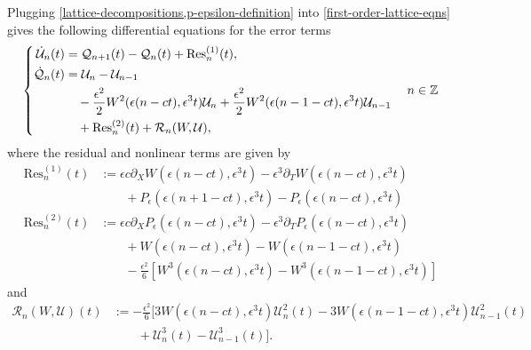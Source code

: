 Plugging \cref{lattice-decompositions,p-epsilon-definition} into \cref{first-order-lattice-eqns} gives the following differential equations for the error terms
\begin{equation}\label{error-lattice-eqns}
\left\{\begin{aligned}
		\dot{\mathcal U}_n(t) &= \mathcal Q_{n+1}(t) - \mathcal Q_n(t) + \mathrm{Res}_n^{(1)}(t),  \\
		\dot{\mathcal Q}_n(t) &= \mathcal U_{n} - \mathcal U_{n-1} \\ &\quad - \frac{\epsilon^2} 2 W^2(\epsilon(n-ct),\epsilon^3t) \mathcal{U}_n + \frac{\epsilon^2} 2 W^2(\epsilon(n-1-ct),\epsilon^3t)\mathcal{U}_{n-1} \\ &\quad +\mathrm{Res}_n^{(2)}(t)+ \mathcal R_n(W, \mathcal U),
\end{aligned} \right.\quad  n\in\mathbb{Z}
\end{equation}
where the residual and nonlinear terms are given by 
\begin{equation}
	\begin{aligned}
		\mathrm{Res}^{(1)}_n(t)&:= \epsilon c \partial_X W(\epsilon(n-ct),\epsilon^3t) - \epsilon^3 \partial_T W(\epsilon(n-ct), \epsilon^3 t) \\ 
		&\qquad+ P_\epsilon(\epsilon(n+1 - ct), \epsilon^3t) - P_\epsilon(\epsilon(n-ct), \epsilon^3t) \\
		\mathrm{Res}^{(2)}_n(t)&:= \epsilon c \partial_X P_\epsilon(\epsilon(n-ct),\epsilon^3t) - \epsilon^3\partial_T P_\epsilon (\epsilon(n-ct), \epsilon^3t) \\ 
		&\qquad + W(\epsilon(n-ct),\epsilon^3t) - W(\epsilon(n-1-ct), \epsilon^3t) \\ 
		&\qquad- \frac{\epsilon^2} 6 \left[ W^3(\epsilon (n-ct), \epsilon^3t) - W^3(\epsilon(n-1-ct), \epsilon^3t) \right]
	\end{aligned}
\end{equation}
and 
\begin{equation}
\begin{aligned}
	\mathcal R_n(W,\mathcal U)(t) &:= - \frac{\epsilon^2} 6 \Big[ 3W(\epsilon(n-ct),\epsilon^3t)\mathcal{U}^2_n(t) - 3 W(\epsilon(n-1-ct), \epsilon^3t)\mathcal U^2_{n-1}(t)  \\ 
	&\qquad+ \mathcal U^3_n(t) - \mathcal U^3_{n-1}(t)\Big].
\end{aligned}
\end{equation}

